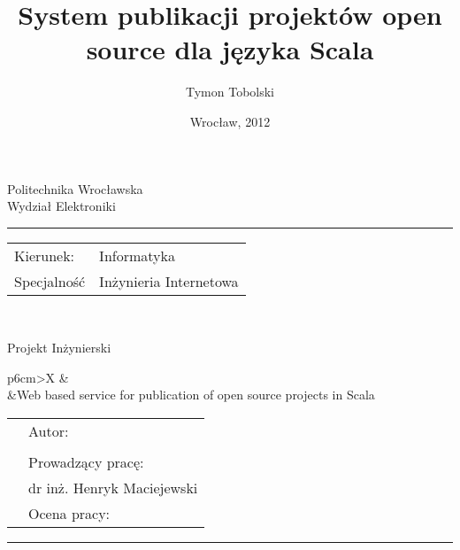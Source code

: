 \documentclass[a4paper,onecolumn,oneside,12pt]{memoir}
\makeatletter
\newcommand\uczelnia[1]{\renewcommand\@uczelnia{#1}}
\newcommand\@uczelnia{}
\newcommand\wydzial[1]{\renewcommand\@wydzial{#1}}
\newcommand\@wydzial{}
\newcommand\kierunek[1]{\renewcommand\@kierunek{#1}}
\newcommand\@kierunek{}
\newcommand\specjalnosc[1]{\renewcommand\@specjalnosc{#1}}
\newcommand\@specjalnosc{}
\newcommand\titleEN[1]{\renewcommand\@titleEN{#1}}
\newcommand\@titleEN{}
\newcommand\promotor[1]{\renewcommand\@promotor{#1}}
\newcommand\@promotor{}
\def\maketitle{%
  \null
  \pagestyle{empty}%
  {\centering\vspace{-1cm}
    {\fontsize{22pt}{24pt}\selectfont \@uczelnia}\\[0.4cm]
    {\fontsize{22pt}{24pt}\selectfont \@wydzial }\\[0.5cm]
    \hrule \vspace*{0.7cm}
  }
{\flushleft\fontsize{14pt}{16pt}\selectfont%
\begin{tabular}{ll}
Kierunek: & \@kierunek\\
Specjalność & \@specjalnosc\\
\end{tabular}\\[1.3cm]
}
{\centering
{\fontsize{24pt}{26pt}\selectfont Projekt Inżynierski}\\[1.5cm]
}
%
\begin{tabularx}{\linewidth}{p{6cm}>{\centering\arraybackslash}X}
    &{\fontsize{16pt}{18pt}\selectfont \@title}\\[5mm]  %
    &{\fontsize{16pt}{18pt}\selectfont \@titleEN}\\[10mm] %
\end{tabularx}
\vfill
\begin{tabularx}{\linewidth}{p{6cm}l}
    &{\fontsize{16pt}{18pt}\selectfont Autor:}\\[5mm]
    &{\fontsize{14pt}{16pt}\selectfont \@author}\\[10mm]
    &{\fontsize{16pt}{18pt}\selectfont Prowadzący pracę:}\\[5mm]
    &{\fontsize{14pt}{16pt}\selectfont \@promotor}\\[10mm]
    &{\fontsize{16pt}{18pt}\selectfont Ocena pracy:}\\[20mm]
  \end{tabularx}
\hrule\vspace*{0.3cm}
{\centering
{\fontsize{16pt}{18pt}\selectfont \@date}\\[0cm]
}
\normalfont
 \cleardoublepage
}
\makeatother
\begin{document}
\title{System publikacji projektów open source dla języka Scala}
\titleEN{Web based service for publication of open source projects in Scala}
\author{Tymon Tobolski}
\uczelnia{Politechnika Wrocławska}
\wydzial{Wydział Elektroniki}
\kierunek{Informatyka}
\specjalnosc{Inżynieria Internetowa}
\promotor{dr inż. Henryk Maciejewski}
\date{Wrocław, 2012}
\maketitle

\pagestyle{outer}


\nocite{*}
\end{document}

